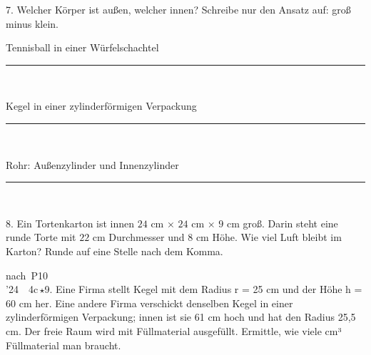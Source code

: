 \documentclass[11pt]{article}
\newlength{\gEin}\setlength{\gEin}{0pt}
\newcommand{\gzwei}[2]{\par\smallskip\noindent\sbox{\gbox}{#1}%
  \setlength{\gLinks}{\dimexpr0.5\textwidth-\gEin-\mbpfnr\relax}%
  \ifdim\wd\gbox>\dimexpr\gLinks-4mm\relax
    \usebox{\gbox}\par\smallskip\noindent\begin{minipage}{\linewidth}#2\end{minipage}%
  \else
    \begin{minipage}[t]{\gLinks}\vspace{0pt}\usebox{\gbox}\end{minipage}%
    \begin{minipage}[t]{\dimexpr\linewidth-\gLinks\relax}\vspace{0pt}\raggedright #2\end{minipage}%
  \fi\par}
\newcommand{\karo}[1]{\par\smallskip\noindent\begin{tikzpicture}
  \clip (0,0) rectangle ({\linewidth-1mm},{#1*10mm});
  \draw[black!16,line width=0.3pt,step=5mm] (0,0) grid ({\linewidth},{#1*10mm});
  \end{tikzpicture}\par}
\newcommand{\linie}[1]{\,{\color{black!45}\rule[-1pt]{#1}{0.4pt}}\,}
\newcommand{\pkt}{\textperiodcentered{}}
\begin{document}
\Needspace*{0.16\textheight}
\begin{pfaufg}{}{7.}{}
Welcher Körper ist außen, welcher innen? Schreibe nur den Ansatz auf: groß minus klein.
\par\smallskip
\par\noindent{}Tennisball in einer Würfelschachtel\hfill\linie{30mm}
\par\noindent{}Kegel in einer zylinderförmigen Verpackung\hfill\linie{30mm}
\par\noindent{}Rohr: Außenzylinder und Innenzylinder\hfill\linie{30mm}
\par{}
\end{pfaufg}
\begin{pfaufg}{}{8.}{}
Ein Tortenkarton ist innen $24$ cm × $24$ cm × $9$ cm groß. Darin steht eine runde Torte mit $22$ cm Durchmesser und $8$ cm Höhe. Wie viel Luft bleibt im Karton? Runde auf eine Stelle nach dem Komma.
\hfill \leerfeld[cm³] 
\end{pfaufg}
\begin{pfaufg}{nach~P10\\’24~\pkt{}~4c\,$\star$}{9.}{}
Eine Firma stellt Kegel mit dem Radius r = 25 cm und der Höhe h = 60 cm her. Eine andere Firma verschickt denselben Kegel in einer zylinderförmigen Verpackung; innen ist sie 61 cm hoch und hat den Radius 25,5 cm. Der freie Raum wird mit Füllmaterial ausgefüllt. Ermittle, wie viele cm³ Füllmaterial man braucht.
\gzwei{\parbox[t]{\dimexpr0.5\textwidth-\gEin-\mbpfnr-5mm\relax}{\small\itshape Skizze}}{\karo{2}}
\end{pfaufg}
\end{document}
